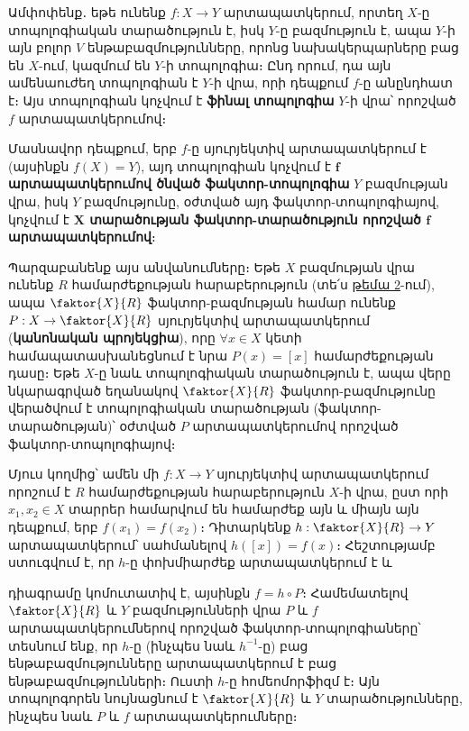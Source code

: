 \documentclass[./main.tex]{subfiles}
\begin{document}
\par Ամփոփենք․ եթե ունենք $f:X\to Y$ արտապատկերում, որտեղ $X$-ը տո\-պո\-լո\-գիա\-կան տարածություն է, իսկ $Y$-ը բազմություն է, ապա $Y$-ի այն բոլոր $V$ են\-թա\-բազ\-մութ\-յուն\-ները, որոնց նախակերպարները բաց են $X$-ում, կազմում են $Y$-ի տոպո\-լոգիա։ Ընդ որում, դա այն ամենաուժեղ տոպոլոգիան է $Y$-ի վրա, որի դեպքում $f$-ը ան\-ընդ\-հատ է։ Այս տոպոլոգիան կոչվում է \textbf{ֆինալ տոպոլոգիա} $Y$-ի վրա՝ որոշված $f$ արտապատկերումով։

\par Մասնավոր դեպքում, երբ $f$-ը սյուրյեկտիվ արտապատկերում է (այսինքն $f(X)=Y$), այդ տոպոլոգիան կոչվում է \textbf{$\boldsymbol f$ արտապատկերումով ծնված ֆակտոր-տոպո\-լո\-գիա} $Y$ բազմության վրա, իսկ $Y$ բազմությունը, օժտված այդ ֆակտոր-տոպոլոգիա\-յով, կոչվում է \textbf{$\boldsymbol X$ տարածության ֆակտոր-տարածություն որոշված $\boldsymbol f$ արտապատ\-կե\-րումով}։

\par Պարզաբանենք այս անվանումները։ Եթե $X$ բազմության վրա ունենք $R$ հա\-մար\-ժե\-քութ\-յան հարաբերություն (տե՛ս \hyperlink{sec:2}{թեմա 2}-ում), ապա $\faktor{X}{R}$ ֆակտոր-բազմու\-թյան համար ունենք $P:X\to \faktor{X}{R}$ սյուրյեկտիվ արտապատկերում (\textbf{կանոնական պրո\-յեկ\-ցիա}), որը $\forall x \in X$ կետի համապատասխանեցնում է նրա $P(x)=[x]$ համարժե\-քու\-թյան դասը։ Եթե $X$-ը նաև տոպոլոգիական տարածություն է, ապա վերը նկարա\-գրված եղանակով $\faktor{X}{R}$ ֆակտոր-բազ\-մու\-թյունը վերածվում է տոպոլոգիական տա\-րա\-ծու\-թյան (ֆակտոր-տարածութ\-յան)՝ օժտված $P$ արտապատկերումով որոշված ֆակտոր-տո\-պո\-լոգիայով։

\par Մյուս կողմից՝ ամեն մի ${f:X\to Y}$ սյուրյեկտիվ արտապատկերում որոշում է $R$ համարժեքության հարաբերություն $X$-ի վրա, ըստ որի $x_1, x_2\in X$ տարրեր հա\-մար\-վում են համարժեք այն և միայն այն դեպքում, երբ $f(x_1)=f(x_2)$։ Դիտարկենք $h:\faktor{X}{R}\to Y$ արտապատկերում՝ սահմանելով $h([x])=f(x)$։ Հեշտությամբ ստուգ\-վում է, որ $h$-ը փոխմիարժեք արտապատկերում է և
\begin{center}
\end{center}
դիագրամը կոմուտատիվ է, այսինքն $f=h\circ P$։ Համեմատելով $\faktor{X}{R}$ և $Y$ բազմութ\-յուն\-ների վրա $P$ և $f$ արտապատկերումներով որոշված ֆակտոր-տոպոլոգիաները՝ տեսնում ենք, որ $h$-ը (ինչպես նաև $h^{-1}$-ը) բաց ենթաբազմությունները արտա\-պատ\-կերում է բաց ենթաբազմությունների։ Ուստի $h$-ը հոմեոմորֆիզմ է։ Այն տոպո\-լո\-գորեն նույնացնում է $\faktor{X}{R}$ և $Y$ տարածությունները, ինչպես նաև $P$ և $f$ արտա\-պատ\-կերում\-ները։
\end{document}
